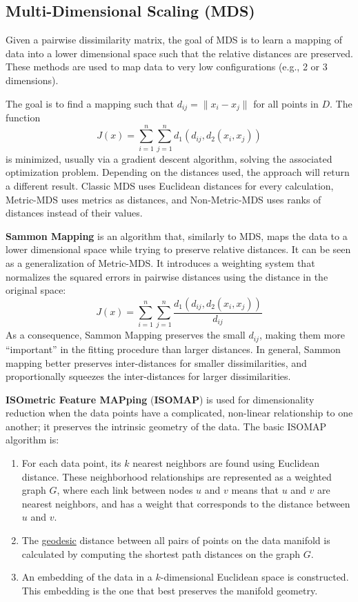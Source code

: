 \subsection{Multi-Dimensional Scaling (MDS)}

Given a pairwise dissimilarity matrix, the goal of MDS is to learn a mapping of data into a lower dimensional space such that the relative distances are preserved. These methods are used to map data to very low configurations (e.g., 2 or 3 dimensions).

The goal is to find a mapping such that $d_{ij} = \|x_i - x_j\|$ for all points in $D$. The function
    \begin{equation*}
        J(x) = \sum_{i=1}^n \sum_{j=1}^n d_1 (d_{ij}, d_2(x_i, x_j))
    \end{equation*}
is minimized, usually via a gradient descent algorithm, solving the associated optimization problem. Depending on the distances used, the approach will return a different result. Classic MDS uses Euclidean distances for every calculation, Metric-MDS uses metrics as distances, and Non-Metric-MDS uses ranks of distances instead of their values.

\textbf{Sammon Mapping} is an algorithm that, similarly to MDS, maps the data to a lower dimensional space while trying to preserve relative distances. It can be seen as a generalization of Metric-MDS. It introduces a weighting system that normalizes the squared errors in pairwise distances using the distance in the original space:
\begin{equation*}
    J(x) = \sum_{i=1}^n \sum_{j=1}^n \dfrac{d_1 (d_{ij}, d_2(x_i, x_j))}{d_{ij}}
\end{equation*}
As a consequence, Sammon Mapping preserves the small $d_{ij}$, making them more ``important'' in the fitting procedure than larger distances. In general, Sammon mapping better preserves inter-distances for smaller dissimilarities, and proportionally squeezes the inter-distances for larger dissimilarities.

\textbf{ISOmetric Feature MAPping} (\textbf{ISOMAP}) is used for dimensionality reduction when the data points have a complicated, non-linear relationship to one another; it preserves the intrinsic geometry of the data. The basic ISOMAP algorithm is:
\begin{enumerate}
    \item For each data point, its $k$ nearest neighbors are found using Euclidean distance. These neighborhood relationships are represented as a weighted graph $G$, where each link between nodes $u$ and $v$ means that $u$ and $v$ are nearest neighbors, and has a weight that corresponds to the distance between $u$ and $v$.

    \item The \href{https://en.wikipedia.org/wiki/Geodesic}{geodesic} distance between all pairs of points on the data manifold is calculated by computing the shortest path distances on the graph $G$.

    \item An embedding of the data in a $k$-dimensional Euclidean space is constructed. This embedding is the one that best preserves the manifold geometry.
\end{enumerate}

